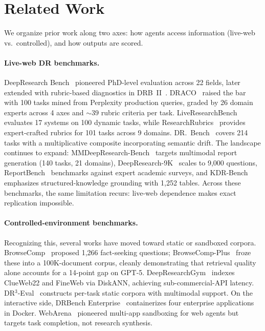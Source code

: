 \documentclass{article}
\begin{document}
\section{Related Work}
\label{sec:related}

We organize prior work along two axes: how agents access information (live-web vs.\ controlled), and how outputs are scored.

\paragraph{Live-web DR benchmarks.} DeepResearch Bench~\citep{drb2025} pioneered PhD-level evaluation across 22 fields, later extended with rubric-based diagnostics in DRB~II~\citep{drb2_2026}. DRACO~\citep{draco2026} raised the bar with 100 tasks mined from Perplexity production queries, graded by 26 domain experts across 4 axes and ${\sim}39$ rubric criteria per task. LiveResearchBench~\citep{liveresearchbench2026} evaluates 17 systems on 100 dynamic tasks, while ResearchRubrics~\citep{researchrubrics2025} provides expert-crafted rubrics for 101 tasks across 9 domains. DR.~Bench~\citep{drbench2026} covers 214 tasks with a multiplicative composite incorporating semantic drift. The landscape continues to expand: MMDeepResearch-Bench~\citep{mmdr2026} targets multimodal report generation (140 tasks, 21 domains), DeepResearch-9K~\citep{dr9k2026} scales to 9{,}000 questions, ReportBench~\citep{reportbench2025} benchmarks against expert academic surveys, and KDR-Bench~\citep{kdrbench2026} emphasizes structured-knowledge grounding with 1{,}252 tables. Across these benchmarks, the same limitation recurs: live-web dependence makes exact replication impossible.

\paragraph{Controlled-environment benchmarks.} Recognizing this, several works have moved toward static or sandboxed corpora. BrowseComp~\citep{browsecomp2025} proposed 1{,}266 fact-seeking questions; BrowseComp-Plus~\citep{browsecomp_plus2025} froze these into a 100K-document corpus, cleanly demonstrating that retrieval quality alone accounts for a 14-point gap on GPT-5. DeepResearchGym~\citep{deepresearchgym2025} indexes ClueWeb22 and FineWeb via DiskANN, achieving sub-commercial-API latency. DR$^3$-Eval~\citep{dr3eval2026} constructs per-task static corpora with multimodal support. On the interactive side, DRBench Enterprise~\citep{drbench_ent2026} containerizes four enterprise applications in Docker. WebArena~\citep{webarena2024} pioneered multi-app sandboxing for web agents but targets task completion, not research synthesis.
\end{document}
